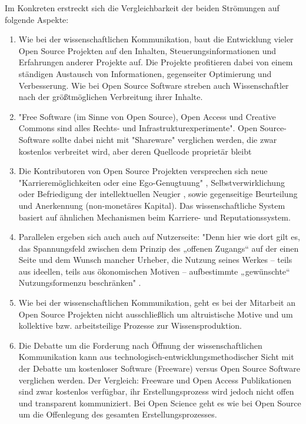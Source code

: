 Im Konkreten erstreckt sich die Vergleichbarkeit der beiden Strömungen auf folgende Aspekte:
\begin{enumerate}
\item Wie bei der wissenschaftlichen Kommunikation, baut die Entwicklung vieler Open Source Projekten auf den Inhalten, Steuerungsinformationen und Erfahrungen anderer Projekte auf. Die Projekte profitieren dabei von einem ständigen Austausch von Informationen, gegenseiter Optimierung und Verbesserung. Wie bei Open Source Software streben auch Wissenschaftler nach der größtmöglichen Verbreitung ihrer Inhalte.
\item "Free Software (im Sinne von Open Source), Open Access und Creative Commons sind alles Rechts- und Infrastrukturexperimente"\cite{kelty_2004}. Open Source-Software sollte dabei nicht mit "Shareware" verglichen werden, die zwar kostenlos verbreitet wird, aber deren Quellcode proprietär bleibt \cite{Lerner_2001}
\item Die Kontributoren von Open Source Projekten versprechen sich neue "Karrieremöglichkeiten oder eine Ego-Genugtuung" \cite{Lerner_2001}, Selbstverwirklichung oder Befriedigung der intellektuellen Neugier \cite{Willinsky_2005}, sowie gegenseitige Beurteilung und Anerkennung (non-monetäres Kapital). Das wissenschaftliche System basiert auf ähnlichen Mechanismen beim Karriere- und Reputationssystem.
\item Parallelen ergeben sich auch auch auf Nutzerseite: "Denn hier wie dort gilt es, das Spannungsfeld zwischen dem Prinzip des „offenen Zugangs“ auf der einen Seite und dem Wunsch mancher Urheber, die Nutzung seines Werkes – teils aus ideellen, teils aus ökonomischen Motiven – aufbestimmte „gewünschte“ Nutzungsformenzu beschränken" \cite{dorschel_2006_open}.
\item Wie bei der wissenschaftlichen Kommunikation, geht es bei der Mitarbeit an Open Source Projekten nicht ausschließlich um altruistische Motive \cite{Lerner_2001} und um kollektive bzw. arbeitsteilige Prozesse zur Wissensproduktion.
\item Die Debatte um die Forderung nach Öffnung der wissenschaftlichen Kommunikation kann aus technologisch-entwicklungsmethodischer Sicht mit der Debatte um kostenloser Software (Freeware) versus Open Source Software verglichen werden. Der Vergleich: Freeware und Open Access Publikationen sind zwar kostenlos verfügbar, ihr Erstellungsprozess wird jedoch nicht offen und transparent kommuniziert. Bei Open Science geht es wie bei Open Source um die Offenlegung des gesamten Erstellungsprozesses.
\end{enumerate}

